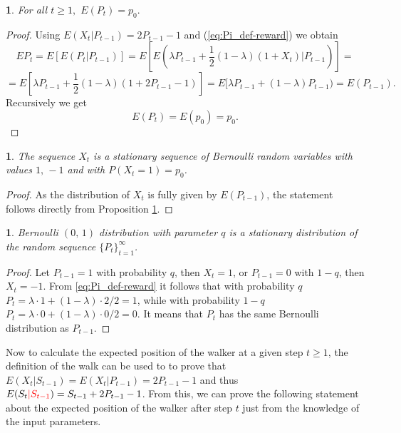\documentclass{amsart}
\theoremstyle{definition}
\theoremstyle{plain}
\newtheorem{prop}[thm]{\protect\propositionname}
\theoremstyle{plain}
\theoremstyle{plain}
\numberwithin{equation}{section}
\providecommand{\propositionname}{Proposition}
\begin{document}
    \begin{prop}
        \label{PropReward2}For all $t\geq1,$ $E(P_{t})=p_{0}.$
    \end{prop}
    \begin{proof}
        Using $E(X_{t}|P_{t-1})=2P_{t-1}-1$ and (\ref{eq:Pi_def-reward})
        we obtain
        \[
            EP_{t}=E[E(P_{t}|P_{t-1})]=E[E(\lambda P_{t-1}+\frac{1}{2}(1-\lambda)(1+X_{t})|P_{t-1})]=
        \]
        \[
            =E[\lambda P_{t-1}+\frac{1}{2}(1-\lambda)(1+2P_{t-1}-1)]=E[\lambda P_{t-1}+(1-\lambda)P_{t-1})= E(P_{t-1}).
        \]
        Recursively we get
        \begin{equation}
            E(P_{t})=E(p_{0})=p_{0}.\label{eq:EPt-reward-formula}
        \end{equation}
    \end{proof}

    \begin{prop}
        The sequence $X_t$ is a stationary sequence of Bernoulli random
        variables with values $1,\,-1$ and with $P(X_t=1)=p_0$.
    \end{prop}
    \begin{proof}
        As the distribution of $X_t$ is fully given by $E(P_{t-1})$, the
        statement follows directly from Proposition \ref{PropReward2}.
    \end{proof}

    \begin{prop}
        Bernoulli $(0,\,1)$ distribution with parameter $q$ is  {\color{red}a} stationary distribution of the random sequence
        ${\{P_{t}\}}_{t=1}^{\infty}$.
    \end{prop}
    \begin{proof}
        Let $P_{t-1}=1$ with probability $q$, then $X_t=1$, or
        $P_{t-1}=0$ with $1-q$, then $X_t=-1$. From \eqref{eq:Pi_def-reward} it follows that with probability
        $q$ $P_t=\lambda\cdot 1+(1-\lambda)\cdot 2/2=1$, while with
        probability $1-q$ $P_t=\lambda\cdot 0+(1-\lambda)\cdot 0/2=0$.
        It means that $P_t$ has the same Bernoulli distribution as
        $P_{t-1}$.
    \end{proof}

    Now to calculate the expected position of the walker at a given
    step $t\geq1$, {\color{red} the definition of the walk can be used to to prove that $E(X_{t}|S_{t-1})=E(X_{t}|P_{t-1}) = 2P_{t-1}-1$ and thus}
    $E(S_{t}{\color{red}|S_{t-1}})=S_{t-1}+2P_{t-1}-1$. From this, we can prove the
    following statement about the expected position of the walker
    after step $t$ just from the knowledge of the input parameters.
\end{document}
